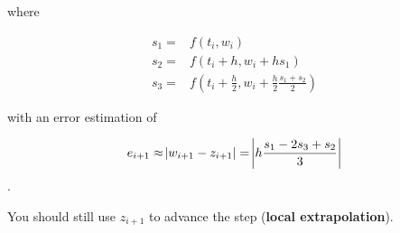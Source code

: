 where

\begin{align*}
    s_1 = & f(t_i,w_i) \\
    s_2 = & f(t_i + h,w_i + hs_1) \\
    s_3 = & f(t_i + \frac{h}{2},w_i + \frac{h}{2}\frac{s_1 + s_2}{2})
\end{align*}

with an error estimation of

$$
e_{i+1} \approx \abs{w_{i+1} - z_{i+1}} = \abs{h\frac{s_1 - 2s_3 + s_2}{3}}
$$.

You should still use $z_{i+1}$ to advance the step (\textbf{local extrapolation}).